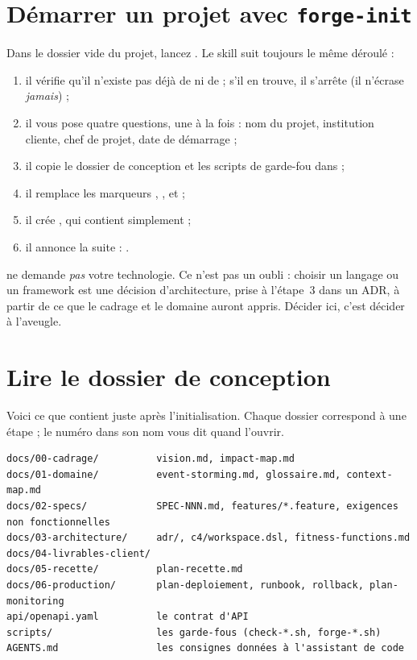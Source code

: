 \section{Démarrer un projet avec \texttt{forge-init}}
Dans le dossier vide du projet, lancez . Le skill suit toujours le même déroulé :
\begin{enumerate}
  \item il vérifie qu'il n'existe pas déjà de  ni de  ; s'il en trouve, il s'arrête (il n'écrase \emph{jamais}) ;
  \item il vous pose quatre questions, une à la fois : nom du projet, institution cliente, chef de projet, date de démarrage ;
  \item il copie le dossier de conception et les scripts de garde-fou dans  ;
  \item il remplace les marqueurs , \cmd{[INSTITUTION]}, \cmd{[NOM]} et \cmd{[JJ/MM/AAAA]} ;
  \item il crée , qui contient simplement  ;
  \item il annonce la suite : .
\end{enumerate}

\begin{piege}
 ne demande \emph{pas} votre technologie. Ce n'est pas un oubli : choisir un
langage ou un framework est une décision d'architecture, prise à l'étape~3 dans un ADR, à partir
de ce que le cadrage et le domaine auront appris. Décider ici, c'est décider à l'aveugle.
\end{piege}

\section{Lire le dossier de conception}
Voici ce que contient  juste après l'initialisation. Chaque dossier correspond à une étape ;
le numéro dans son nom vous dit quand l'ouvrir.
\begin{code}
\begin{Verbatim}
docs/00-cadrage/          vision.md, impact-map.md
docs/01-domaine/          event-storming.md, glossaire.md, context-map.md
docs/02-specs/            SPEC-NNN.md, features/*.feature, exigences non fonctionnelles
docs/03-architecture/     adr/, c4/workspace.dsl, fitness-functions.md
docs/04-livrables-client/
docs/05-recette/          plan-recette.md
docs/06-production/       plan-deploiement, runbook, rollback, plan-monitoring
api/openapi.yaml          le contrat d'API
scripts/                  les garde-fous (check-*.sh, forge-*.sh)
AGENTS.md                 les consignes données à l'assistant de code
\end{Verbatim}
\end{code}

